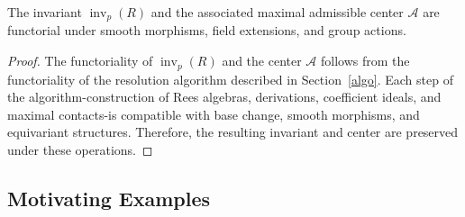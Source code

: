 \documentclass{amsart}
\newcommand{\inv}{{\operatorname{inv}}}
\begin{document}
\begin{lemma} \label{funct}
The invariant \( \inv_p(R) \) and the associated maximal admissible center \( \mathcal{A} \) are functorial under smooth morphisms, field extensions, and group actions.
\end{lemma}

\begin{proof}
The functoriality of \( \inv_p(R) \) and the center \( \mathcal{A} \) follows from the functoriality of the resolution algorithm described in Section~\ref{algo}. Each step of the algorithm-construction of Rees algebras, derivations, coefficient ideals, and maximal contacts-is compatible with base change, smooth morphisms, and equivariant structures. Therefore, the resulting invariant and center are preserved under these operations.
\end{proof}
\subsection{Motivating Examples}\label{ex}
\end{document}
